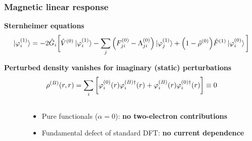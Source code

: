 \begin{frame}
\frametitle{Magnetic linear response}
\centering
\textbf{Sternheimer equations}
\begin{equation}
    \nonumber
    \ket{\varphi_i^{(1)}} = -2\hat{G}_i\bigg[
    \hat{V}^{(0)}\ket{\varphi_i^{(1)}} -
    \sum_j \Big(F^{(0)}_{ji} - \Lambda^{(0)}_{ji}\Big)
    \ket{\varphi_j^{(1)}} +
    \Big(1 - \hat{\rho}^{(0)}\Big)
    \hat{F}^{(1)}\ket{\varphi_i^{(0)}}
    \bigg]
\end{equation}

\vspace{5mm}



\vspace{5mm}

\textbf{Perturbed density vanishes for imaginary (static) perturbations}
\begin{equation}
    \nonumber
    \rho^{(B)}(r,r) = \sum_i 
    \bigg[
    \varphi_i^{(0)}(r)\varphi_i^{(B)\dagger}(r) +
    \varphi_i^{(B)}(r)\varphi_i^{(0)\dagger}(r)
    \bigg]
    \equiv 0
\end{equation}

\vspace{5mm}

\pause
\begin{columns}
\begin{column}[b]{0.1\linewidth}
\end{column}
\begin{column}[b]{0.9\linewidth}
\begin{itemize}
    \item   Pure functionals ($\alpha=0$): \textbf{no two-electron contributions}
    \item   Fundamental defect of standard DFT: \textbf{no current dependence}
\end{itemize}
\end{column}
\end{columns}
\end{frame}

